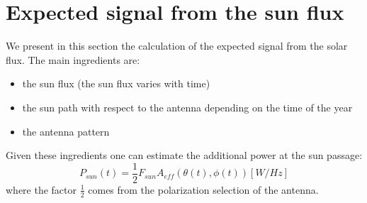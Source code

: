 \section{Expected signal from the sun flux}
\label{sec:expectedsignal}
We present in this section the calculation of the expected signal from
the solar flux. The main ingredients are:
\begin{itemize}
\item the sun flux (the sun flux varies with time)
\item the sun path with respect to the antenna depending on the time of the year
\item the antenna pattern
\end{itemize}
Given these ingredients  one can estimate the additional  power at the
sun passage:
\begin{equation}
  P_{sun}(t) = \frac{1}{2}F_{sun}A_{eff}(\theta(t),\phi(t)) [W/Hz]
\end{equation}
where the  factor $\frac{1}{2}$ comes from  the polarization selection
of the antenna. 

